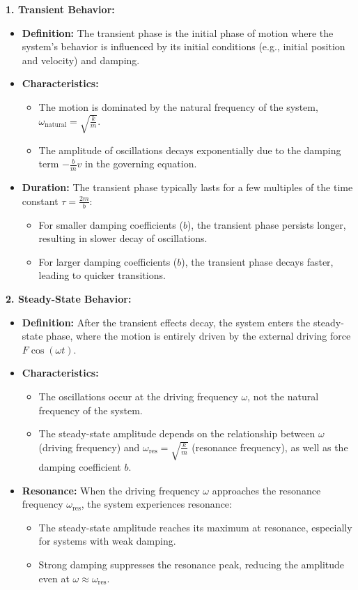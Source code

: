 \documentclass {article}
\begin{document}
\begin{enumerate}
\textbf{1. Transient Behavior:}
\begin{itemize}
    \item \textbf{Definition:} The transient phase is the initial phase of motion where the system's behavior is influenced by its initial conditions (e.g., initial position and velocity) and damping.
    \item \textbf{Characteristics:}
    \begin{itemize}
        \item The motion is dominated by the natural frequency of the system, $\omega_{\text{natural}} = \sqrt{\frac{k}{m}}$.
        \item The amplitude of oscillations decays exponentially due to the damping term $-\frac{b}{m} v$ in the governing equation.
    \end{itemize}
    \item \textbf{Duration:} The transient phase typically lasts for a few multiples of the time constant $\tau = \frac{2m}{b}$:
    \begin{itemize}
        \item For smaller damping coefficients ($b$), the transient phase persists longer, resulting in slower decay of oscillations.
        \item For larger damping coefficients ($b$), the transient phase decays faster, leading to quicker transitions.
    \end{itemize}
\end{itemize}

\textbf{2. Steady-State Behavior:}
\begin{itemize}
    \item \textbf{Definition:} After the transient effects decay, the system enters the steady-state phase, where the motion is entirely driven by the external driving force $F \cos(\omega t)$.
    \item \textbf{Characteristics:}
    \begin{itemize}
        \item The oscillations occur at the driving frequency $\omega$, not the natural frequency of the system.
        \item The steady-state amplitude depends on the relationship between $\omega$ (driving frequency) and $\omega_{\text{res}} = \sqrt{\frac{k}{m}}$ (resonance frequency), as well as the damping coefficient $b$.
    \end{itemize}
    \item \textbf{Resonance:} When the driving frequency $\omega$ approaches the resonance frequency $\omega_{\text{res}}$, the system experiences resonance:
    \begin{itemize}
        \item The steady-state amplitude reaches its maximum at resonance, especially for systems with weak damping.
        \item Strong damping suppresses the resonance peak, reducing the amplitude even at $\omega \approx \omega_{\text{res}}$.
    \end{itemize}
\end{itemize}


\end{enumerate}
\end{document}
